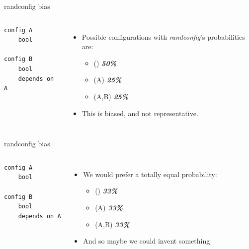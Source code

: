 \documentclass[mathserif,serif]{beamer}
\newenvironment{items}{
\begin{itemize}
  \setlength{\itemsep}{0pt}
  \setlength{\parskip}{7pt}
  \setlength{\parsep}{4pt}
}{\end{itemize}}
\begin{document}
\begin{frame}[t,fragile]{randconfig bias}

    \begin{columns}[T]
    \begin{Verbatim}
config A
    bool

config B
    bool
    depends on A
    \end{Verbatim}

    \pause

    \begin{items}
        \item Possible configurations with \emph{randconfig}'s probabilities  are:
        \begin{items}
            \item () \textbf{\emph{50\%}}
            \item (A) \textbf{\emph{25\%}}
            \item (A,B) \textbf{\emph{25\%}}
        \end{items}
        \pause
        \item This is biased, and not representative.
    \end{items}

    \end{columns}
\end{frame}

\begin{frame}[t,fragile]{randconfig bias}

    \begin{columns}[T]

    \begin{Verbatim}
config A
    bool

config B
    bool
    depends on A
    \end{Verbatim}


    \begin{items}
        \item We would prefer a totally equal probability:
        \begin{items}
            \item () \textbf{\emph{33\%}}
            \item (A) \textbf{\emph{33\%}}
            \item (A,B) \textbf{\emph{33\%}}
        \end{items}
        \pause
        \item And so maybe we could invent something
    \end{items}

    \end{columns}
\end{frame}
\end{document}
